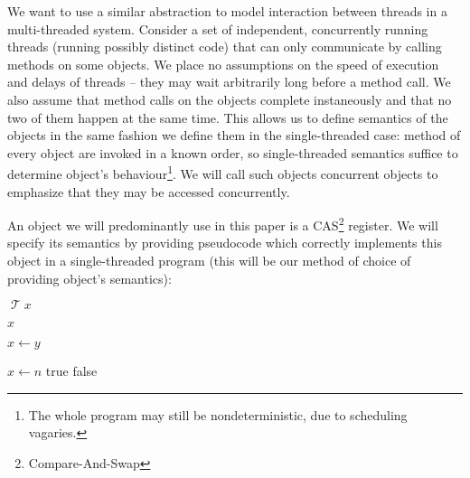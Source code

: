 \documentclass[a4paper,11pt]{article}
\def\T{\ensuremath{\operatorname{\mathcal{T}}}\text{ }}
\begin{document}
We want to use a similar abstraction to model interaction between threads in a multi-threaded system.
Consider a set of independent, concurrently running threads (running possibly
distinct code) that can only communicate by calling methods on some objects. We place no assumptions on
the speed of execution and delays of threads -- they may wait arbitrarily long before a method call.
We also assume that method calls on the objects complete instaneously and that no two of them happen at the same time.
This allows us to define semantics of the objects in the same fashion we define them in the single-threaded case:
method of every object are invoked in a known order, so single-threaded semantics suffice to determine object's behaviour\footnote{The whole program may still be nondeterministic, due to scheduling vagaries.}.
We will call such objects concurrent objects to emphasize that they may be accessed concurrently.




An object we will predominantly use in this paper is a CAS\footnote{Compare-And-Swap} register.
We will specify its semantics by providing pseudocode which correctly implements this object in
a single-threaded program (this will be our method of choice of providing object's semantics):

\begin{algorithmic}[1]
\State \T $x$

	\State\Return $x$
\EndFunction

	\State $x \gets y$
\EndFunction

	\State $x \gets n$
	\State\Return true
\Else
	\State\Return false
\EndIf
\EndFunction
\end{algorithmic}
\end{document}
